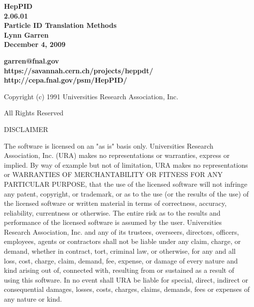 \begin{titlepage}

 

\vspace{2.0in}
\begin{center}
  {\LARGE\bf  HepPID \\ 2.06.01 \\}
  {\Large\bf  Particle ID Translation Methods \\}
  {\Large\bf  Lynn Garren \\}
  {\Large\bf  December 4, 2009 \\}
\end{center}
\vspace{2.0in}
\begin{center}
  {\large\bf  garren@fnal.gov \\}
  {\large\bf  https://savannah.cern.ch/projects/heppdt/ \\}
  {\large\bf  http://cepa.fnal.gov/psm/HepPID/ \\}
\end{center}

\end{titlepage}

\vspace{0.5in}
\centerline{ Copyright (c) 1991   Universities Research Association, Inc. }
\centerline{   All Rights Reserved }
\vspace{0.2in}
\centerline{ DISCLAIMER }

The software is licensed on an "as is" basis only.  Universities Research
Association, Inc. (URA) makes no representations or warranties, express
or implied.  By way of example but not of limitation, URA makes no
representations or WARRANTIES OF MERCHANTABILITY OR FITNESS FOR ANY
PARTICULAR PURPOSE, that  the use of the licensed software will not
infringe any patent, copyright, or trademark, or as to the use (or the
results of the use) of the licensed  software or written material in
terms of correctness, accuracy, reliability, currentness or otherwise.
The entire risk as to the results and performance of the  licensed
software is assumed by the user.  Universities Research Association, Inc.
and any of its trustees, overseers, directors, officers, employees,
agents or contractors shall not be liable under any claim, charge, or
demand, whether in contract, tort, criminal law, or otherwise, for any
and all loss, cost, charge, claim, demand, fee, expense, or damage of
every nature and kind arising out of, connected with, resulting from or
sustained as a result of using this software. In no event shall URA be
liable for special, direct, indirect or consequential damages, losses,
costs, charges, claims, demands, fees or expenses of any  nature or kind.
 
